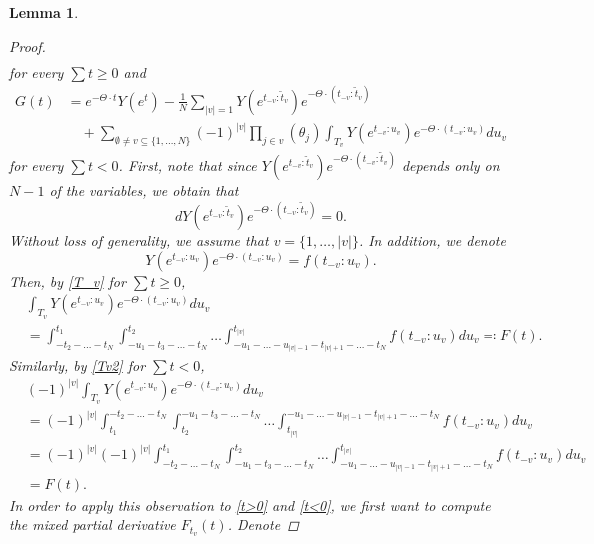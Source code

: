 \documentclass[english, a4paper, 12pt,reqno]{amsart}
\newtheorem{lemma}[defi]{Lemma}
\begin{document}
\begin{lemma}
\begin{proof}
\begin{equation}
\begin{split}
\end{split}
\end{equation}
for every $\sum t\geq 0$ and 
\begin{equation}
\label{t<0}
\begin{split}
 G(t)
&= e^{-\Theta\cdot t} Y(e^t)-\frac{1}{N} \sum_{|v| =1} Y(e^{t_{-v}:\tilde{t}_v})e^{-\Theta\cdot ({t_{-v}:\tilde{t}_v})} \\ &\quad + \sum_{\emptyset\neq v \subseteq \{1,\dots,N\}}(-1)^{|v|} \prod_{j\in v}(\theta_j) \int_{T_v} Y(e^{t_{-v}:u_v})e^{-\Theta\cdot ({t_{-v}:u_v})}du_v   
\end{split}
\end{equation}
for every $\sum t < 0$. First, note that since $Y(e^{t_{-v}:\tilde{t}_v})e^{-\Theta\cdot ({t_{-v}:\tilde{t}_v})}$ depends only on $N-1$ of the variables, we obtain that 
\begin{equation}
\label{zerodifferential}
d Y(e^{t_{-v}:\tilde{t}_v})e^{-\Theta\cdot ({t_{-v}:\tilde{t}_v})}=0.
\end{equation}
Without loss of generality, we assume that $v=\{1,\dots,|v|\}$. In addition, we denote 
$$Y(e^{t_{-v}:u_v})e^{-\Theta\cdot ({t_{-v}:u_v})} = f(t_{-v}:u_v).$$
Then, by \eqref{T_v} for $\sum t \geq 0$,
\begin{equation*}
\begin{split}
&\int_{T_v} Y(e^{t_{-v}:u_v})e^{-\Theta\cdot ({t_{-v}:u_v})}du_v \\ &=\int_{-t_2-\dots-t_{N}}^{t_1} \int_{-u_1-t_3-\dots-t_{N}}^{t_2} \dots \int_{-u_1-\dots-u_{|v|-1}-t_{|v|+1}-\dots-t_N}^{t_{|v|}} f({t_{-v}:u_v}) du_v \eqqcolon F(t).
\end{split}
\end{equation*}
Similarly, by \eqref{Tv2} for $\sum t < 0$,
\begin{equation*}
\begin{split}
&(-1)^{|v|} \int_{T_v} Y(e^{t_{-v}:u_v})e^{-\Theta\cdot ({t_{-v}:u_v})}du_v \\ &=(-1)^{|v|}\int_{t_1}^{-t_2-\dots-t_{N}} \int_{t_2}^{-u_1-t_3-\dots-t_{N}} \dots \int_{t_{|v|}}^{-u_1-\dots-u_{|v|-1}-t_{|v|+1}-\dots-t_N} f({t_{-v}:u_v}) du_v \\
&= (-1)^{|v|}(-1)^{|v|}\int_{-t_2-\dots-t_{N}}^{t_1} \int_{-u_1-t_3-\dots-t_{N}}^{t_2} \dots \int_{-u_1-\dots-u_{|v|-1}-t_{|v|+1}-\dots-t_N}^{t_{|v|}} f({t_{-v}:u_v}) du_v\\
&= F(t).
\end{split}
\end{equation*}
In order to apply this observation to \eqref{t>0} and \eqref{t<0}, we first want to compute the mixed partial derivative $F_{t_v}(t)$. Denote

\end{proof}
\end{lemma}
\end{document}
